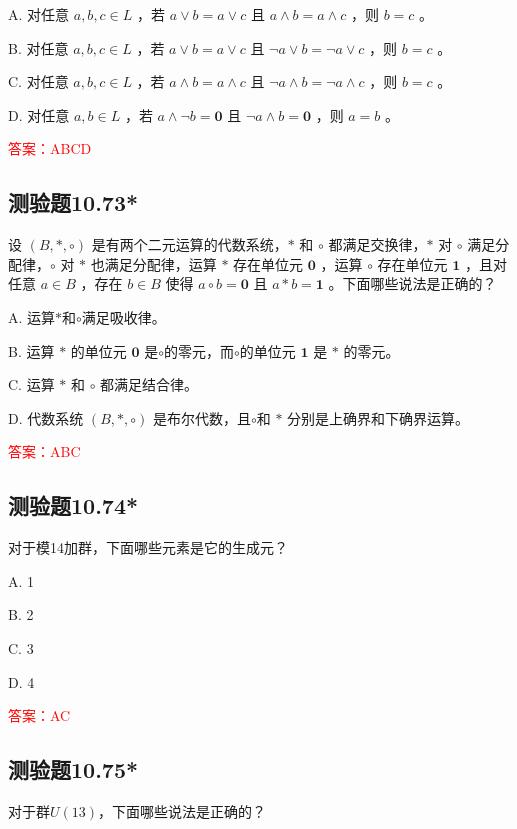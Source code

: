 \documentclass[UTF8, heading=true]{ctexart}
\begin{document}
A. 对任意 $a, b, c \in L$ ，若 $a \vee b=a \vee c$ 且 $a \wedge b=a \wedge c$ ，则 $b=c$ 。

B. 对任意 $a, b, c \in L$ ，若 $a \vee b=a \vee c$ 且 $\neg a \vee b=\neg a \vee c$ ，则 $b=c$ 。

C. 对任意 $a, b, c \in L$ ，若 $a \wedge b=a \wedge c$ 且 $\neg a \wedge b=\neg a \wedge c$ ，则 $b=c$ 。

D. 对任意 $a, b \in L$ ，若 $a \wedge \neg b=\mathbf{0}$ 且 $\neg a \wedge b=\mathbf{0}$ ，则 $a=b$ 。


\textcolor{red}{答案：ABCD}



\subsection{测验题10.73*}

设 $(B, *, \circ)$ 是有两个二元运算的代数系统，$*$ 和 $\circ$ 都满足交换律，$*$ 对 $\circ$ 满足分配律，$\circ$ 对 $*$ 也满足分配律，运算 $*$ 存在单位元 $\mathbf{0}$ ，运算 $\circ$ 存在单位元 $\mathbf{1}$ ，且对任意 $a \in B$ ，存在 $b \in B$ 使得 $a \circ b=\mathbf{0}$ 且 $a * b=\mathbf{1}$ 。下面哪些说法是正确的？

A. 运算$*$和$\circ$满足吸收律。

B. 运算 $*$ 的单位元 $\mathbf{0}$ 是$\circ$的零元，而$\circ$的单位元 $\mathbf{1}$ 是 $*$ 的零元。

C. 运算 $*$ 和 $\circ$ 都满足结合律。

D. 代数系统 $(B, *, \circ)$ 是布尔代数，且$\circ$和 $*$ 分别是上确界和下确界运算。

\textcolor{red}{答案：ABC}

\subsection{测验题10.74*}

对于模14加群，下面哪些元素是它的生成元？

A. 1

B. 2

C. 3

D. 4

\textcolor{red}{答案：AC}

\subsection{测验题10.75*}

对于群$U(13)$，下面哪些说法是正确的？
\end{document}
